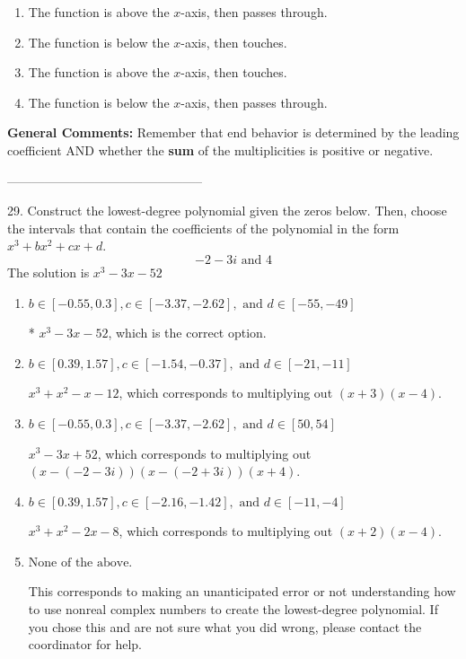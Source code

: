 \documentclass{extbook}[14pt]
\begin{document}
\begin{enumerate}[label=\Alph*.] 
\item The function is above the $x$-axis, then passes through.  
\item The function is below the $x$-axis, then touches.  
\item The function is above the $x$-axis, then touches.  
\item The function is below the $x$-axis, then passes through.  
\end{enumerate} 
 
\textbf{General Comments:} Remember that end behavior is determined by the leading coefficient AND whether the \textbf{sum} of the multiplicities is positive or negative.

-----------------------------------------------

29. Construct the lowest-degree polynomial given the zeros below. Then, choose the intervals that contain the coefficients of the polynomial in the form $x^3+bx^2+cx+d$.
\[ -2 - 3i \text{ and } 4 \] 
The solution is $ x^{3} -3 x -52 $ 

\begin{enumerate}[label=\Alph*.] 
\item $ b \in [-0.55, 0.3], c \in [-3.37, -2.62], \text{ and } d \in [-55, -49] $ 

 * $x^{3} -3 x -52$, which is the correct option. 
\item $ b \in [0.39, 1.57], c \in [-1.54, -0.37], \text{ and } d \in [-21, -11] $ 

 $x^{3} + x^{2} -x -12$, which corresponds to multiplying out $(x + 3)(x -4)$. 
\item $ b \in [-0.55, 0.3], c \in [-3.37, -2.62], \text{ and } d \in [50, 54] $ 

 $x^{3} -3 x + 52$, which corresponds to multiplying out $(x-(-2 - 3i))(x-(-2 + 3i))(x + 4)$. 
\item $ b \in [0.39, 1.57], c \in [-2.16, -1.42], \text{ and } d \in [-11, -4] $ 

 $x^{3} + x^{2} -2 x -8$, which corresponds to multiplying out $(x + 2)(x -4)$. 
\item $ \text{None of the above.} $ 

 This corresponds to making an unanticipated error or not understanding how to use nonreal complex numbers to create the lowest-degree polynomial. If you chose this and are not sure what you did wrong, please contact the coordinator for help. 
\end{enumerate} 
 
\end{document}
